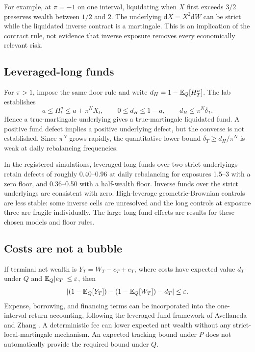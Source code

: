 For example, at $\pi=-1$ on one interval, liquidating when $X$ first
exceeds $3/2$ preserves wealth between $1/2$ and $2$. The underlying
$\mathrm{d}X=X^2\mathrm{d}W$ can be strict while the liquidated inverse
contract is a martingale. This is an implication of the contract rule,
not evidence that inverse exposure removes every economically relevant
risk.

\subsection{Leveraged-long funds}
For $\pi>1$, impose the same floor rule and write
$d_H=1-\mathbb{E}_Q[H_T^a]$. The lab establishes
\begin{equation}\label{eq:longbound}
 a\leq H_t^a\leq a+\pi^N X_t,
 \qquad 0\leq d_H\leq1-a,
 \qquad d_H\leq\pi^N\delta_T.
\end{equation}
Hence a true-martingale underlying gives a true-martingale liquidated
fund. A positive fund defect implies a positive underlying defect, but
the converse is not established. Since $\pi^N$ grows rapidly, the
quantitative lower bound $\delta_T\geq d_H/\pi^N$ is weak at daily
rebalancing frequencies.

In the registered simulations, leveraged-long funds over two strict
underlyings retain defects of roughly 0.40--0.96 at daily rebalancing
for exposures 1.5--3 with a zero floor, and 0.36--0.50 with a half-wealth
floor. Inverse funds over the strict underlyings are consistent with zero.
High-leverage geometric-Brownian controls are less stable: some inverse
cells are unresolved and the long controls at exposure three are fragile
individually. The large long-fund effects are results for these chosen
models and floor rules.

\subsection{Costs are not a bubble}
If terminal net wealth is $Y_T=W_T-c_T+e_T$, where costs have expected
value $d_T$ under $Q$ and $\mathbb{E}_Q|e_T|\leq\varepsilon$, then
\begin{equation}\label{eq:cost}
 \left|(1-\mathbb{E}_Q[Y_T])-(1-\mathbb{E}_Q[W_T])-d_T\right|\leq\varepsilon.
\end{equation}
Expense, borrowing, and financing terms can be incorporated into the
one-interval return accounting, following the leveraged-fund framework
of Avellaneda and Zhang \cite{avellaneda2009path}. A deterministic fee
can lower expected net wealth without any strict-local-martingale
mechanism. An expected tracking bound under $P$ does not automatically
provide the required bound under $Q$.

